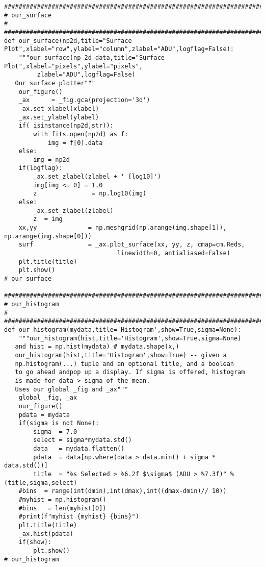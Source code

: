 {\begin{verbatim}
##############################################################################
# our_surface
#
##############################################################################
def our_surface(np2d,title="Surface Plot",xlabel="row",ylabel="column",zlabel="ADU",logflag=False):
    """our_surface(np_2d_data,title="Surface Plot",xlabel="pixels",ylabel="pixels",
         zlabel="ADU",logflag=False)
   Our surface plotter"""
    our_figure()
    _ax      = _fig.gca(projection='3d')
    _ax.set_xlabel(xlabel)
    _ax.set_ylabel(ylabel)
    if( isinstance(np2d,str)):
        with fits.open(np2d) as f:
            img = f[0].data
    else:
        img = np2d
    if(logflag):
        _ax.set_zlabel(zlabel + ' [log10]')
        img[img <= 0] = 1.0
        z               = np.log10(img)
    else:
        _ax.set_zlabel(zlabel)
        z  = img
    xx,yy              = np.meshgrid(np.arange(img.shape[1]), np.arange(img.shape[0]))
    surf               = _ax.plot_surface(xx, yy, z, cmap=cm.Reds,
                               linewidth=0, antialiased=False)
    plt.title(title)
    plt.show()
# our_surface

##############################################################################
# our_histogram
#
##############################################################################
def our_histogram(mydata,title='Histogram',show=True,sigma=None):
    """our_histogram(hist,title='Histogram',show=True,sigma=None)
   and hist = np.hist(mydata) # mydata.shape(x,)
   our_histogram(hist,title='Histogram',show=True) -- given a
   np.histogram(...) tuple and an optional title, and a boolean
   to go ahead andpop up a display. If sigma is offered, histogram
   is made for data > sigma of the mean.
   Uses our global _fig and _ax"""
    global _fig, _ax
    our_figure()
    pdata = mydata
    if(sigma is not None):
        sigma  = 7.0
        select = sigma*mydata.std()
        data   = mydata.flatten()
        pdata  = data[np.where(data > data.min() + sigma * data.std())]
        title  = "%s Selected > %6.2f $\sigma$ (ADU > %7.3f)" % (title,sigma,select)
    #bins  = range(int(dmin),int(dmax),int((dmax-dmin)// 10))
    #myhist = np.histogram()
    #bins   = len(myhist[0])
    #print(f"myhist {myhist} {bins}")
    plt.title(title)
    _ax.hist(pdata)
    if(show):
        plt.show()
# our_histogram


\end{verbatim}}
